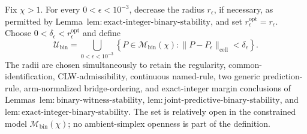 Fix \(\chi>1\).  For every \(0<\epsilon<10^{-3}\), decrease the radius \(r_\epsilon\), if necessary, as permitted by Lemma~\(\mathrm{lem{:}exact\text{-}integer\text{-}binary\text{-}stability}\), and set \(r_\epsilon^{\mathrm{opt}}=r_\epsilon\).  Choose \(0<\delta_\epsilon<r_\epsilon^{\mathrm{opt}}\) and define
\[
 \mathcal U_{\mathrm{bin}}
 =\bigcup_{0<\epsilon<10^{-3}}
 \left\{P\in\mathcal M_{\mathrm{bin}}(\chi):
 \|P-P_\epsilon\|_{\mathrm{cell}}<\delta_\epsilon\right\}. \tag{1}
\]
The radii are chosen simultaneously to retain the regularity, common-identification, CLW-admissibility, continuous named-rule, two generic prediction-rule, arm-normalized bridge-ordering, and exact-integer margin conclusions of Lemmas~\(\mathrm{lem{:}binary\text{-}witness\text{-}stability}\), \(\mathrm{lem{:}joint\text{-}predictive\text{-}binary\text{-}stability}\), and \(\mathrm{lem{:}exact\text{-}integer\text{-}binary\text{-}stability}\).  The set is relatively open in the constrained model \(\mathcal M_{\mathrm{bin}}(\chi)\); no ambient-simplex openness is part of the definition.